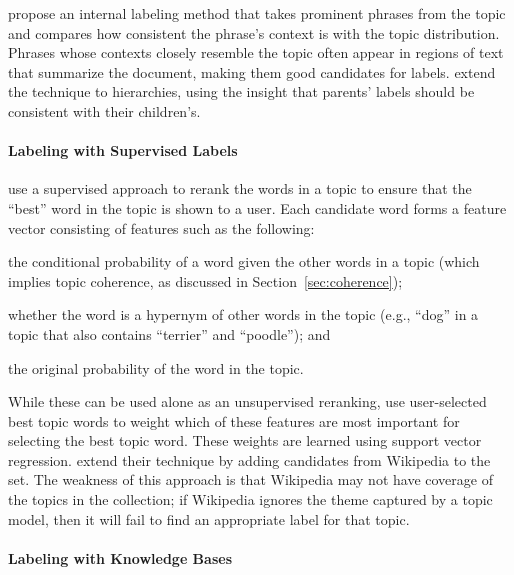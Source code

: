 \citet{mei-07} propose an internal labeling method that takes
prominent phrases from the topic and compares how consistent the
phrase's context is with the topic distribution.  Phrases whose
contexts closely resemble the topic often appear in regions of text
that summarize the document, making them good candidates for labels.
\citet{mao-12} extend the technique to hierarchies, using the insight
that parents' labels should be consistent with their children's.



\paragraph{Labeling with Supervised Labels}


\citet{lau-10} use a supervised approach to rerank the words in a
topic to ensure that the ``best'' word in the topic is shown to a
user. Each candidate word forms a feature vector consisting of
features such as the following:
\begin{itemize*}
\item the conditional probability of a word given the other words in a
  topic (which implies topic coherence, as discussed in
  Section~\ref{sec:coherence});
\item whether the word is a hypernym of other words in the topic
  (e.g., ``dog'' in a topic that also contains ``terrier'' and
  ``poodle''); and
\item the original probability of the word in the topic.
\end{itemize*}

While these can be used alone as an unsupervised reranking,
\citet{lau-10} use user-selected best topic words to weight which of
these features are most important for selecting the best topic word.
These weights are learned using support vector regression.
\citet{lau-11} extend their technique by adding candidates from
Wikipedia to the set.
The weakness of this approach is that Wikipedia may not have coverage
of the topics in the collection; if Wikipedia ignores the theme
captured by a topic model, then it will fail to find an appropriate
label for that topic.

\paragraph{Labeling with Knowledge Bases}

